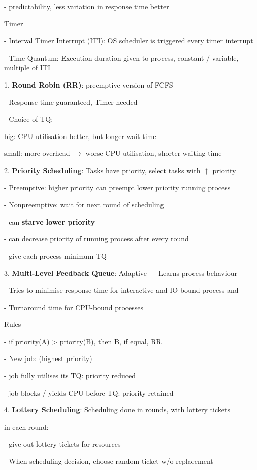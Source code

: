 \documentclass[10pt, a4paper]{article}
\newcommand{\highlight}[1]{{\color{red}\textbf{#1}}}
\newcommand{\red}[1]{{\color{red}#1}}
\newcommand{\green}[1]{{\color{ForestGreen}#1}}
\newcommand{\tab}[0]{\hspace*{2mm}}
\begin{document}
\begin{multicols*}{3}
		\tab{} - predictability, less variation in response time better

		Timer 

		- Interval Timer Interrupt (ITI): OS scheduler is triggered every timer interrupt

		- Time Quantum: Execution duration given to process, constant / variable, multiple of ITI

		1. \textbf{Round Robin (RR)}: \red{preemptive version} of FCFS

		- Response time guaranteed, Timer needed

		- Choice of TQ:

		\tab{} big: CPU utilisation better, but longer wait time

		\tab{} small: more overhead $\rightarrow$ worse CPU utilisation, shorter waiting time

		2. \textbf{Priority Scheduling}: Tasks have priority, select tasks with $\uparrow$ priority

		- Preemptive: higher priority can preempt lower priority running process

		- Nonpreemptive: wait for next round of scheduling

		- can \highlight{starve lower priority}

		\tab{} - can decrease priority of running process after every round

		\tab{} - give each process minimum TQ

		3. \textbf{Multi-Level Feedback Queue}: \green{Adaptive} --- Learns process behaviour 

		- Tries to minimise response time for interactive and IO bound process and

		- Turnaround time for CPU-bound processes

		Rules

		- if priority(A) > priority(B), then B, if equal, RR

		- New job: \green(highest priority)

		- job fully utilises its TQ: \red{priority reduced}

		- job blocks / yields CPU before TQ: \green{priority retained}

		4. \textbf{Lottery Scheduling}: Scheduling done in rounds, with lottery tickets

		in each round:

		\tab{} - give out lottery tickets for resources

		\tab{} - When scheduling decision, choose \red{random ticket w/o replacement}


\end{multicols*}
\end{document}
